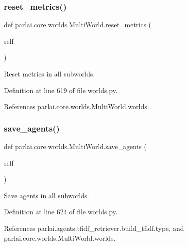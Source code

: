 \subsubsection{\texorpdfstring{reset\+\_\+metrics()}{reset\_metrics()}}
{\footnotesize\ttfamily def parlai.\+core.\+worlds.\+Multi\+World.\+reset\+\_\+metrics (\begin{DoxyParamCaption}\item[{}]{self }\end{DoxyParamCaption})}

\begin{DoxyVerb}Reset metrics in all subworlds.\end{DoxyVerb}
 

Definition at line 619 of file worlds.\+py.



References parlai.\+core.\+worlds.\+Multi\+World.\+worlds.

\mbox{\label{classparlai_1_1core_1_1worlds_1_1MultiWorld_a4d72a950f8aae3d248a9694908f0fc85}} 
\subsubsection{\texorpdfstring{save\+\_\+agents()}{save\_agents()}}
{\footnotesize\ttfamily def parlai.\+core.\+worlds.\+Multi\+World.\+save\+\_\+agents (\begin{DoxyParamCaption}\item[{}]{self }\end{DoxyParamCaption})}

\begin{DoxyVerb}Save agents in all subworlds.\end{DoxyVerb}
 

Definition at line 624 of file worlds.\+py.



References parlai.\+agents.\+tfidf\+\_\+retriever.\+build\+\_\+tfidf.\+type, and parlai.\+core.\+worlds.\+Multi\+World.\+worlds.

\mbox{\label{classparlai_1_1core_1_1worlds_1_1MultiWorld_ae780a8cfd7c6b675727cca24b8321015}} 
